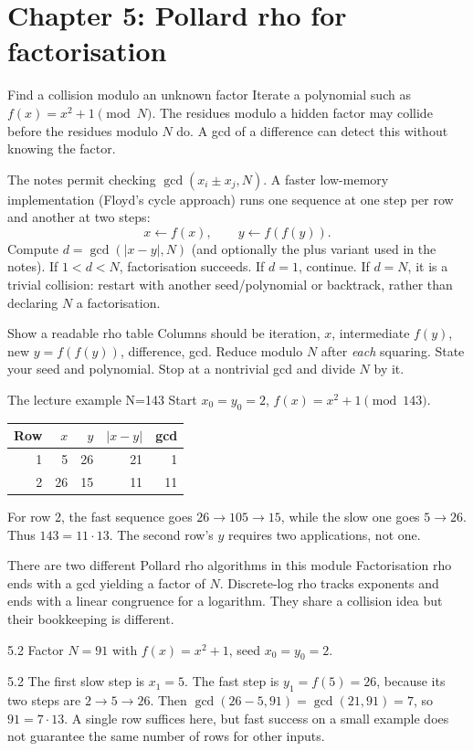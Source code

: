 \documentclass[11pt,a4paper]{article}
\begin{document}
\section{Chapter 5: Pollard rho for factorisation}
\begin{concept}{Find a collision modulo an unknown factor}
Iterate a polynomial such as \(f(x)=x^2+1\pmod N\). The residues modulo a hidden factor may collide before the residues modulo \(N\) do. A gcd of a difference can detect this without knowing the factor.

The notes permit checking \(\gcd(x_i\pm x_j,N)\). A faster low-memory implementation (Floyd's cycle approach) runs one sequence at one step per row and another at two steps:
\[x\leftarrow f(x),\qquad y\leftarrow f(f(y)).\]
Compute \(d=\gcd(|x-y|,N)\) (and optionally the plus variant used in the notes). If \(1<d<N\), factorisation succeeds. If \(d=1\), continue. If \(d=N\), it is a trivial collision: restart with another seed/polynomial or backtrack, rather than declaring \(N\) a factorisation.
\end{concept}
\begin{method}{Show a readable rho table}
Columns should be iteration, \(x\), intermediate \(f(y)\), new \(y=f(f(y))\), difference, gcd. Reduce modulo \(N\) after \emph{each} squaring. State your seed and polynomial. Stop at a nontrivial gcd and divide \(N\) by it.
\end{method}
\begin{example}{The lecture example N=143}
Start \(x_0=y_0=2\), \(f(x)=x^2+1\pmod{143}\).
\begin{center}\begin{tabular}{rrrrr}\toprule Row&\(x\)&\(y\)&\(|x-y|\)&gcd\\\midrule
1&5&26&21&1\\2&26&15&11&11\\\bottomrule\end{tabular}\end{center}
For row 2, the fast sequence goes \(26\to105\to15\), while the slow one goes \(5\to26\). Thus \(143=11\cdot13\). The second row's \(y\) requires two applications, not one.
\end{example}
\begin{tip}{There are two different Pollard rho algorithms in this module}
Factorisation rho ends with a gcd yielding a factor of \(N\). Discrete-log rho tracks exponents and ends with a linear congruence for a logarithm. They share a collision idea but their bookkeeping is different.
\end{tip}
\begin{question}{5.2}
Factor \(N=91\) with \(f(x)=x^2+1\), seed \(x_0=y_0=2\).
\end{question}
\begin{answer}{5.2}
The first slow step is \(x_1=5\). The fast step is \(y_1=f(5)=26\), because its two steps are \(2\to5\to26\). Then \(\gcd(26-5,91)=\gcd(21,91)=7\), so \(91=7\cdot13\). A single row suffices here, but fast success on a small example does not guarantee the same number of rows for other inputs.
\end{answer}
\end{document}
